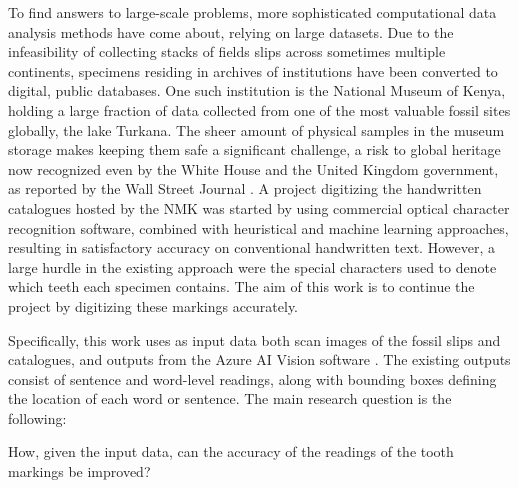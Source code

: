\documentclass{article}
\begin{document}
To find answers to large-scale problems, more sophisticated computational data analysis methods have come about,
relying on large datasets. Due to the infeasibility of collecting stacks of fields slips across sometimes multiple 
continents, specimens residing in archives of institutions have been converted to digital, public databases.
One such institution is the National Museum of Kenya, holding a large fraction of data collected from one 
of the most valuable fossil sites globally, the lake Turkana. The sheer amount of physical samples in the museum storage
makes keeping them safe a significant challenge, a risk to global heritage now recognized even by the White House and 
the United Kingdom government, as reported by the Wall Street Journal \cite{hotzMuseumOverflowingPrehistoric2024}.
 A project digitizing the handwritten catalogues hosted by the NMK was started by
using commercial optical character recognition software, combined with heuristical and machine learning approaches, 
resulting in satisfactory accuracy on conventional handwritten text. However, a large hurdle in the existing 
approach were the special characters used to denote which teeth each specimen contains. The aim of this work is 
to continue the project by digitizing these markings accurately.


Specifically, this work uses as input data both scan images of the fossil slips and catalogues, and outputs from the Azure AI Vision software \cite{azurevision}. The existing outputs consist of sentence and word-level readings, along with bounding boxes defining 
the location of each word or sentence. The main research question is the following: 

How, given the input data, can the accuracy of the readings of the tooth markings be improved?

\end{document}
